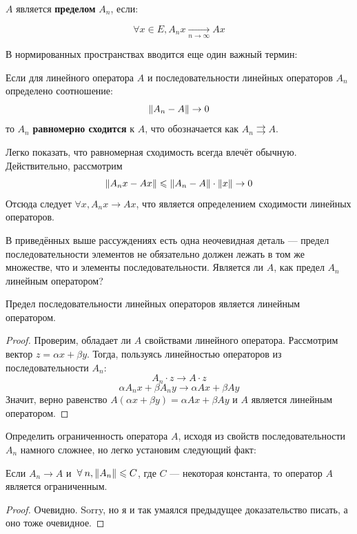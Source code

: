 \documentclass[12pt]{article}
\begin{document}
	\begin{defi}
		$A$ является \textbf{пределом} $A_n$, если:
		
		$$\forall x \in E, A_n x \underset{n \rightarrow \infty}{\rightarrow} A x$$
	\end{defi}
	В нормированных пространствах вводится еще один 
	важный термин:
	
	\begin{defi}
		Если для линейного оператора $A$ и последовательности линейных операторов $A_n$ определено соотношение:
		$$\left\| A_n - A \right\| \rightarrow 0$$
		то $A_n$ \textbf{равномерно сходится} к $A$, что обозначается как $A_n \rightrightarrows A$.
	\end{defi}
	
	Легко показать, что равномерная сходимость всегда влечёт обычную. Действительно, рассмотрим
	$$\left\| A_n x - A x \right\| \leqslant \left\| A_n - A \right\| \cdot \left\| x \right\| \rightarrow 0$$
	Отсюда следует $\forall x, A_n x \rightarrow A x$, что является определением сходимости линейных операторов.
	
	В приведённых выше рассуждениях есть одна неочевидная деталь --- предел последовательности элементов не обязательно должен лежать
	в том же множестве, что и элементы последовательности. Является ли $A$, как предел $A_n$ линейным оператором?
	
	\begin{state}
		Предел последовательности линейных операторов является линейным оператором.
	\end{state}
	\begin{proof}
		Проверим, обладает ли $A$ свойствами линейного оператора. Рассмотрим вектор $z = \alpha x + \beta y$. Тогда, пользуясь линейностью
		операторов из последовательности $A_n$:
		$$ A_n \cdot z \rightarrow A \cdot z $$
		$$ \alpha A_n x + \beta A_n y \rightarrow \alpha A x + \beta A y $$
		Значит, верно равенство $A(\alpha x + \beta y) = \alpha A x + \beta A y$ и $A$ является линейным оператором.
	\end{proof}
	
	Определить ограниченность оператора $A$, исходя из свойств последовательности $A_n$ намного сложнее, но легко установим следующий
	факт:
	\begin{state}
		Если $A_n \rightarrow A$ и $\forall n, \norm{A_n} \leq C$, где $C$ --- некоторая константа, то оператор $A$ является ограниченным.
	\end{state} 
	\begin{proof}
		Очевидно. {\color{gray}Sorry, но я и так умаялся предыдущее доказательство писать, а оно тоже очевидное.}
	\end{proof}
\end{document}
